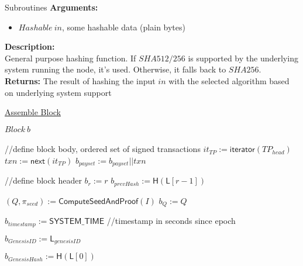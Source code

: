 \documentclass[10pt,a4paper]{article}
\begin{document}
\begin{section}{Subroutines}
\noindent \textbf{Arguments:}
\begin{itemize}
    \item $Hashable \ in$, some hashable data (plain bytes)
  \end{itemize}

\noindent \textbf{Description:}\\
General purpose hashing function. If $SHA512/256$ is supported by the underlying system running the node, it's used.
Otherwise, it falls back to $SHA256$.\\

\noindent \textbf{Returns:}
    The result of hashing the input $in$ with the selected algorithm based on underlying system support


\begin{algorithm}[H]
    \caption{\underline{Assemble Block}}
    \label{algo:assemble-block}
    \begin{algorithmic}[1]

    \State $Block \ b$ \\ \\

    //define block body, ordered set of signed transactions
    \State $it_{TP} := \mathsf{iterator}(TP_{head})$
        \State $txn := \mathsf{next}(it_{TP})$
            \State $b_{payset} :=  b_{payset}||txn$ \\
        \EndIf
    \EndWhile

    //define block header
    \State $b_{r} := r$
    \State $b_{prevHash} := \mathsf{H}(\mathsf{L}[r-1])$
    
    \State $(Q, \pi_{seed}) := \mathsf{ComputeSeedAndProof}(I)$
    \State $b_{Q} := Q$

    \State $b_{timestamp} := \mathsf{SYSTEM\_TIME}$ //timestamp in seconds since epoch

    \State $b_{GenesisID} := \mathsf{L}_{genesisID}$

    \State $b_{GenesisHash} := \mathsf{H}(\mathsf{L}[0])$



\end{algorithmic}
\end{algorithm}
\end{section}
\end{document}
